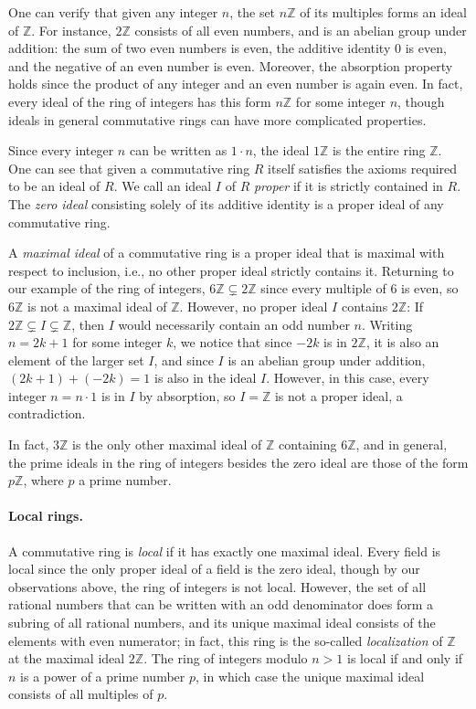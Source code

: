 \documentclass{article}
\begin{document}
One can verify that given any integer $n$, the set $n\mathbb{Z}$ of its multiples forms an ideal of $\mathbb{Z}$.  For instance, $2 \mathbb{Z}$ consists of all even numbers, and is an abelian group under addition: the sum of two even numbers is even, the additive identity $0$ is even, and the negative of an even number is even.
Moreover, the absorption property holds since the product of any integer and an even number is again even. 
In fact, every ideal of the ring of integers has this form $n\mathbb{Z}$ for some integer $n$, though ideals in general commutative rings can have more complicated properties. 

Since every integer $n$ can be written as $1 \cdot n$, the ideal $1 \mathbb{Z}$ is the entire ring $\mathbb{Z}$.   One can see that given a commutative ring $R$ itself satisfies the axioms required to be an ideal of $R$.  We call an ideal $I$ of $R$ \emph{proper} if it is strictly contained in $R$.  The \emph{zero ideal} consisting solely of its additive identity is a proper ideal of any commutative ring. 

A \emph{maximal ideal} of a commutative ring is a proper ideal that is maximal with respect to inclusion, i.e., no other proper ideal strictly contains it. 
Returning to our example of the ring of integers, $6 \mathbb{Z} \subsetneq 2 \mathbb{Z}$ since every multiple of $6$ is even, 
so $6 \mathbb{Z}$ is not a maximal ideal of $\mathbb{Z}$. 
However, no proper ideal $I$ contains $2 \mathbb{Z}$:  If $2 \mathbb{Z}\subsetneq I \subsetneq \mathbb{Z}$, then $I$  would necessarily contain an odd number $n$.  Writing $n=2k+1$ for some integer $k$, we notice that since $-2k$ is in $2\mathbb{Z}$, it is also an element of the larger set $I$, and since $I$ is an abelian group under addition, $(2k+1) + (-2k) = 1$ is also in the ideal $I$. 
However, in this case, every integer $n = n \cdot 1$ is in $I$ by absorption, so $I = \mathbb{Z}$ is not a proper ideal, a contradiction. 

In fact, $3 \mathbb{Z}$ is the only other maximal ideal of $\mathbb{Z}$ containing $6 \mathbb{Z}$, and in general, the prime ideals in the ring of integers besides the zero ideal are those of the form $p \mathbb{Z}$, where $p$ a prime number. 

\paragraph{Local rings.}
A commutative ring is \emph{local} if it has exactly one maximal ideal.  
Every field is local since the only proper ideal of a field is the zero ideal, though by our observations above, the ring of integers is not local. 
However, the set of all rational numbers that can be written with an odd denominator does form a subring of all rational numbers, and its unique maximal ideal consists of the elements with even numerator; in fact, this ring is the so-called \emph{localization} of $\mathbb{Z}$ at the maximal ideal $2 \mathbb{Z}$.  
The ring of integers modulo $n>1$ is local if and only if $n$ is a power of a prime number $p$,  in which case the unique maximal ideal consists of all multiples of $p$. 
\end{document}
